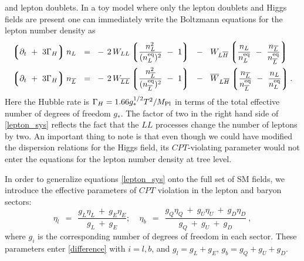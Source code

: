 \documentclass[12pt]{revtex4}
\newcommand{\eq}{{\rm eq}}
\newcommand{\lgr}{\left\lgroup}
\newcommand{\rgr}{\right\rgroup}
\newcommand{\Mpl}{M_{\rm Pl}}
\newcommand{\p}{\partial}
\newcommand{\ov}{\overline}
\begin{document}
	and lepton doublets.
	In a toy model where only the lepton doublets and Higgs fields are present 
    one can immediately write the Boltzmann equations for the lepton number density as
\begin{equation}
\label{lepton_sys}
\begin{split}
	\lgr \p_t ~+~ 3\Gamma_H \rgr 
		n_L ~~=~~ &
	-\, 2\, W_{LL} \lgr \frac{n_L^2}{(n_L^\eq)^2} ~-~ 1 \rgr
	~~-~~
	W_{L\ov{H}} \lgr \frac{n_L}{n_L^\eq} ~-~ 
			\frac{n_{\ov{L}}}{n_{\ov{L}}^\eq} \rgr  \\
	\lgr \p_t ~+~ 3\Gamma_H \rgr 
		n_{\ov{L}} ~~=~~ &
	-\, 2\, W_{\ov{LL}} \lgr 
		\frac{n_{\ov{L}}^2}{(n_{\ov{L}}^\eq)^2} ~-~ 1 \rgr
	~~-~~
	\ov{W}_{L\ov{H}} \lgr \frac{n_{\ov{L}}}{n_{\ov{L}}^\eq} ~-~ 
			\frac{n_L}{n_L^\eq} \rgr.  \\
\end{split}
\end{equation}
	Here the Hubble rate is $\Gamma_H = 1.66 g_*^{1/2} T^2/\Mpl $ in terms of the 
total effective number of degrees of freedom $g_*$. 
The factor of two in the right hand side of \eqref{lepton_sys} reflects the fact 
	that the $LL$ processes change the number of leptons by two.
	An important thing to note is that even though we could have 
	modified the dispersion relations for the Higgs field, 
	its $CPT$-violating parameter would not enter the equations for the lepton number
	density at tree level.
	
	In order to generalize equations \eqref{lepton_sys} onto the full set of 
	SM fields, we introduce the effective parameters of $CPT$ violation in the 
	lepton and baryon sectors:
\begin{equation}
	\eta_l ~~=~~ \frac{ g_L \eta_L ~+~ g_E \eta_E } { g_L ~+~ g_E };~~~~~\eta_b ~~=~~ \frac{g_Q \eta_Q ~+~ g_U \eta_U ~+~ g_D \eta_D} 
			    {g_Q ~+~ g_U ~+~ g_D}~,
\label{effective}
  \end{equation}
where $g_i$ is the corresponding number of degrees of freedom in each sector. These parameters 
enter \eqref{difference} with $i=l,b$, and $g_l = g_L +g_E $,  $g_b= g_Q+g_U+g_D$. 


\end{document}
